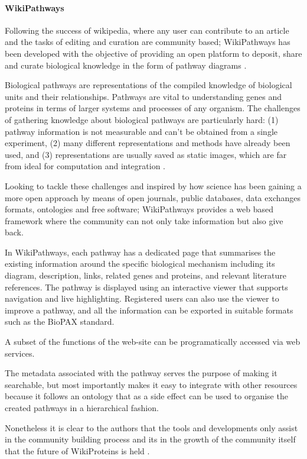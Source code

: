\paragraph{WikiPathways}
Following the success of wikipedia, where any user can contribute to an article and the tasks of editing and curation are community based; WikiPathways has been developed with the objective of providing an open platform to deposit, share and curate biological knowledge in the form of pathway diagrams \cite{KEL2012}.

Biological pathways are representations of the compiled knowledge of biological units and their relationships. Pathways are vital to understanding genes and proteins in terms of larger systems and processes of any organism. The challenges of gathering knowledge about biological pathways are particularly hard: (1) pathway information is not measurable and can't be obtained from a single experiment, (2) many different representations and methods have already been used, and (3)  representations are usually saved as static images, which are far from ideal for computation and integration \cite{PIC2008}.

Looking to tackle these challenges and inspired by how science has been gaining a more open approach by means of open journals, public databases, data exchanges formats, ontologies and free software; WikiPathways provides a web based framework where the community can not only take information but also give back.

In WikiPathways, each pathway has a dedicated page that summarises the existing information around the specific biological mechanism including its diagram, description, links, related genes and proteins, and relevant literature references. The pathway is displayed using an interactive viewer that supports navigation and live highlighting. Registered users can also use the viewer to improve a pathway, and all the information can be exported in suitable formats such as the BioPAX standard.

A subset of the functions of the web-site can be programatically accessed via web services.

The metadata associated with the pathway serves the purpose of making it searchable, but most importantly makes it easy to integrate with other resources because it follows an ontology that as a side effect can be used to organise the created pathways in a hierarchical fashion.

Nonetheless it is clear to the authors that the tools and developments only assist in the community building process and its in the growth of the community itself that the future of WikiProteins is held \cite{KEL2012}.

